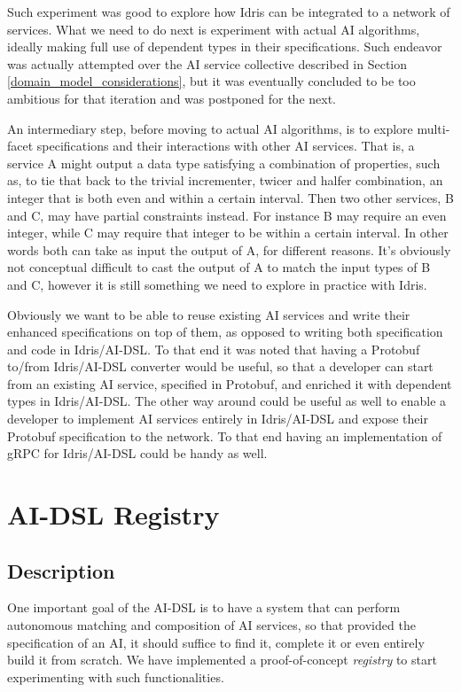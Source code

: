 \documentclass[]{report}
\begin{document}
Such experiment was good to explore how Idris can be integrated to a
network of services.  What we need to do next is experiment with
actual AI algorithms, ideally making full use of dependent types in
their specifications.  Such endeavor was actually attempted over the
AI service collective described in Section
\ref{domain_model_considerations}, but it was eventually concluded to
be too ambitious for that iteration and was postponed for the next.

An intermediary step, before moving to actual AI algorithms, is to
explore multi-facet specifications and their interactions with other
AI services.  That is, a service A might output a data type satisfying
a combination of properties, such as, to tie that back to the trivial
incrementer, twicer and halfer combination, an integer that is both
even and within a certain interval.  Then two other services, B and C,
may have partial constraints instead.  For instance B may require an
even integer, while C may require that integer to be within a certain
interval.  In other words both can take as input the output of A, for
different reasons.  It's obviously not conceptual difficult to cast
the output of A to match the input types of B and C, however it is
still something we need to explore in practice with Idris.

Obviously we want to be able to reuse existing AI services and write
their enhanced specifications on top of them, as opposed to writing
both specification and code in Idris/AI-DSL.  To that end it was noted
that having a Protobuf to/from Idris/AI-DSL converter would be useful,
so that a developer can start from an existing AI service, specified
in Protobuf, and enriched it with dependent types in Idris/AI-DSL.
The other way around could be useful as well to enable a developer to
implement AI services entirely in Idris/AI-DSL and expose their
Protobuf specification to the network.  To that end having an
implementation of gRPC for Idris/AI-DSL could be handy as well.

\section{AI-DSL Registry}
\label{aidsl_registry}

\subsection{Description}

One important goal of the AI-DSL is to have a system that can perform
autonomous matching and composition of AI services, so that provided
the specification of an AI, it should suffice to find it, complete it
or even entirely build it from scratch.  We have implemented a
proof-of-concept \emph{registry} to start experimenting with such
functionalities.
\end{document}
